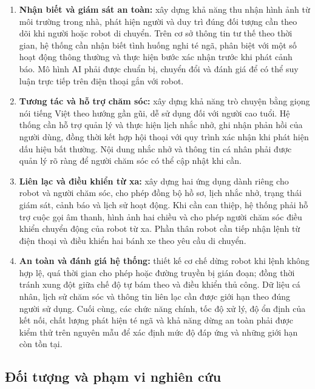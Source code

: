 \begin{enumerate}
    \item \textbf{Nhận biết và giám sát an toàn:} xây dựng khả năng thu nhận hình ảnh từ môi trường trong nhà, phát hiện người và duy trì đúng đối tượng cần theo dõi khi người hoặc robot di chuyển. Trên cơ sở thông tin tư thế theo thời gian, hệ thống cần nhận biết tình huống nghi té ngã, phân biệt với một số hoạt động thông thường và thực hiện bước xác nhận trước khi phát cảnh báo. Mô hình AI phải được chuẩn bị, chuyển đổi và đánh giá để có thể suy luận trực tiếp trên điện thoại gắn với robot.

    \item \textbf{Tương tác và hỗ trợ chăm sóc:} xây dựng khả năng trò chuyện bằng giọng nói tiếng Việt theo hướng gần gũi, dễ sử dụng đối với người cao tuổi. Hệ thống cần hỗ trợ quản lý và thực hiện lịch nhắc nhở, ghi nhận phản hồi của người dùng, đồng thời kết hợp hội thoại với quy trình xác nhận khi phát hiện dấu hiệu bất thường. Nội dung nhắc nhở và thông tin cá nhân phải được quản lý rõ ràng để người chăm sóc có thể cập nhật khi cần.

    \item \textbf{Liên lạc và điều khiển từ xa:} xây dựng hai ứng dụng dành riêng cho robot và người chăm sóc, cho phép đồng bộ hồ sơ, lịch nhắc nhở, trạng thái giám sát, cảnh báo và lịch sử hoạt động. Khi cần can thiệp, hệ thống phải hỗ trợ cuộc gọi âm thanh, hình ảnh hai chiều và cho phép người chăm sóc điều khiển chuyển động của robot từ xa. Phần thân robot cần tiếp nhận lệnh từ điện thoại và điều khiển hai bánh xe theo yêu cầu di chuyển.

    \item \textbf{An toàn và đánh giá hệ thống:} thiết kế cơ chế dừng robot khi lệnh không hợp lệ, quá thời gian cho phép hoặc đường truyền bị gián đoạn; đồng thời tránh xung đột giữa chế độ tự bám theo và điều khiển thủ công. Dữ liệu cá nhân, lịch sử chăm sóc và thông tin liên lạc cần được giới hạn theo đúng người sử dụng. Cuối cùng, các chức năng chính, tốc độ xử lý, độ ổn định của kết nối, chất lượng phát hiện té ngã và khả năng dừng an toàn phải được kiểm thử trên nguyên mẫu để xác định mức độ đáp ứng và những giới hạn còn tồn tại.
\end{enumerate}

\subsection{Đối tượng và phạm vi nghiên cứu}


